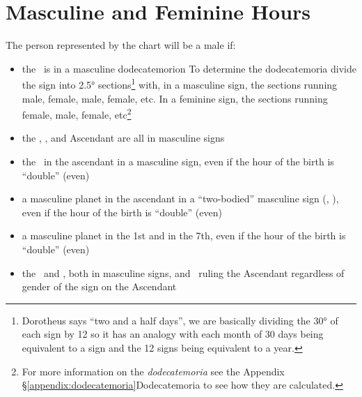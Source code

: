 \section{Masculine and Feminine Hours}

The person represented by the chart will be a male if:
\begin{itemize}[topsep=0em, itemsep=0em]
\item the  \Moon\, is in a masculine dodecatemorion
 \newline\newline
To determine the dodecatemoria divide the sign into 2.5° sections\footnote{Dorotheus says ``two and a half days'', we are basically dividing the 30° of each sign by 12 so it has an analogy with each month of 30 days being equivalent to a sign and the 12 signs being equivalent to a year.} with, in a masculine sign, the sections running male, female, male, female, etc. In a feminine sign, the sections running female, male, female, etc\footnote{For more information on the  \textsl{dodecatemoria} see the Appendix  \S\ref{appendix:dodecatemoria}{Dodecatemoria} to see how they are calculated.}

\item the \Sun, \Moon, and Ascendant are all in masculine signs

\item the \Sun\, in the ascendant in a masculine sign, even if the hour of the birth is ``double'' (even)

\item a masculine planet in the ascendant in a ``two-bodied'' masculine sign (\Gemini, \Sagittarius), even if the hour of the birth is ``double'' (even)

\item a masculine planet in the 1st and in the 7th,  even if the hour of the birth is ``double'' (even) 

\item the \Sun\, and \Moon, both in masculine signs, and \Jupiter\, ruling the Ascendant regardless of gender of the sign on the Ascendant

\end{itemize}